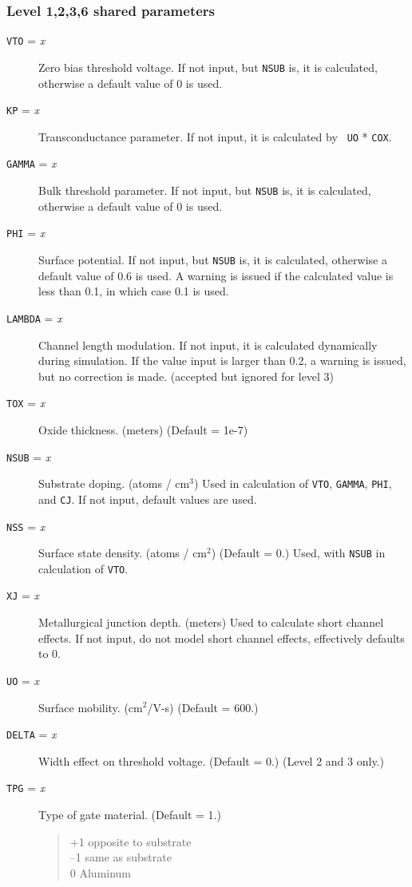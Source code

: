 \subsubsection{Level 1,2,3,6 shared parameters}
\begin{description}

\item[{\tt VTO} = {\it x}]
Zero bias threshold voltage.  If not input, but {\tt NSUB} is, it is
calculated, otherwise a default value of 0 is used.

\item[{\tt KP} = {\it x}]
Transconductance parameter.  If not input, it is calculated by {\tt
UO} * {\tt COX}.

\item[{\tt GAMMA} = {\it x}]
Bulk threshold parameter.  If not input, but {\tt NSUB} is, it is
calculated, otherwise a default value of 0 is used.

\item[{\tt PHI} = {\it x}]
Surface potential.  If not input, but {\tt NSUB} is, it is calculated,
otherwise a default value of 0.6 is used.  A warning is issued if the
calculated value is less than 0.1, in which case 0.1 is used.

\item[{\tt LAMBDA} = {\it x}]
Channel length modulation.  If not input, it is calculated dynamically
during simulation.  If the value input is larger than 0.2, a warning
is issued, but no correction is made.  (accepted but ignored for level
3)

\item[{\tt TOX} = {\it x}]
Oxide thickness. (meters) (Default = 1e-7)

\item[{\tt NSUB} = {\it x}]
Substrate doping.  (atoms / cm$^3$) Used in calculation of {\tt VTO},
{\tt GAMMA}, {\tt PHI}, and {\tt CJ}.  If not input, default values
are used.

\item[{\tt NSS} = {\it x}]
Surface state density.  (atoms / cm$^2$) (Default = 0.) Used, with
{\tt NSUB} in calculation of {\tt VTO}.

\item[{\tt XJ} = {\it x}]
Metallurgical junction depth. (meters) Used to calculate short channel
effects.  If not input, do not model short channel effects,
effectively defaults to 0.

\item[{\tt UO} = {\it x}]
Surface mobility. (cm$^2$/V-s) (Default = 600.)

\item[{\tt DELTA} = {\it x}]
Width effect on threshold voltage.  (Default = 0.)  (Level 2 and 3
only.)

\item[{\tt TPG} = {\it x}]
Type of gate material. (Default = 1.)
\begin{verse}
+1 opposite to substrate\\
--1 same as substrate\\
0 Aluminum
\end{verse}

\end{description}
